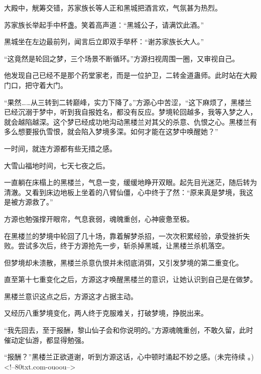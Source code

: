\begin{this_body}
大殿中，觥筹交错，苏家族长等人正和黑城把酒言欢，气氛甚为热烈。

苏家族长举起手中杯盏。笑着高声道：“黑城公子，请满饮此酒。”

黑城坐在左边最前列，闻言后立即双手举杯：“谢苏家族长大人。”

“这竟然是轮回之梦，三个场景不断循环。”方源扫视周围一圈，又审视自己。

他发现自己已经不是那个药堂家老，而是一位护卫，二转金道蛊师。此时站在大殿门口，把守着大门。

“果然……从三转到二转巅峰，实力下降了。”方源心中苦涩，“这下麻烦了，黑楼兰已经沉溺于梦中，听到我自报姓名，都没有反应。梦境轮回越多，我等入梦之人，就会越陷越深。这个梦已经成功地沟动黑楼兰对其父的杀意、仇恨之心。黑楼兰有多么想要报仇雪恨，就会陷入梦境多深。如何才能在这梦中唤醒她？”

一时间，就连方源都有些无措之感。

大雪山福地时间，七天七夜之后。

一直躺在床榻上的黑楼兰，气息一变，缓缓地睁开双眼。起先目光迷茫，随后转为清澈。又看到床边地板上坐着的八臂仙僵，心中终于了然：“原来真是梦境，我这是被方源救了。”

方源也勉强撑开眼帘，气息衰弱，魂魄重创，心神疲惫至极。

在黑楼兰的梦境中轮回了几十场，靠着解梦杀招，一次次积累经验，承受挫折失败。尝试多次后，终于方源抢先一步，斩杀掉黑城，让黑楼兰杀机落空。

但梦境却未溃散，黑楼兰杀意仇恨并未彻底消弭，又引发梦境的第二重变化。

直至第十七重变化之后，方源这才唤醒黑楼兰的意识，让她认识到自己是在做梦。

黑楼兰意识这点之后，方源这才占据主动。

又经历八重梦境变化，两人终于克服难关，打破梦境，挣脱出来。

“我先回去，至于报酬，黎山仙子会和你说明的。”方源魂魄重创，不敢久留，此时催动定仙游，都显得勉强。

“报酬？”黑楼兰正欲道谢，听到方源这话，心中顿时涌起不妙之感。(未完待续 。)<!--80txt.com-ouoou-->

\end{this_body}

